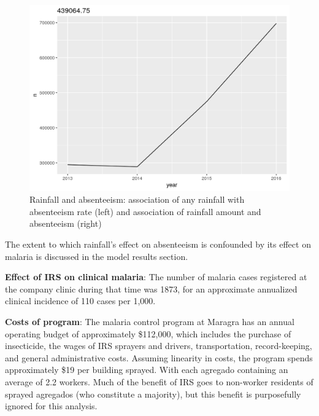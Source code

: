 \documentclass[]{article}
\begin{document}
\begin{figure}[!h]

{\centering \includegraphics{figures/unnamed-chunk-27-1} 

}

\caption{Rainfall and absenteeism: association of any rainfall with absenteeism rate (left) and association of rainfall amount and absenteeism (right)}\label{fig:unnamed-chunk-27}
\end{figure}

The extent to which rainfall's effect on absenteeism is confounded by
its effect on malaria is discussed in the model results section.

\textbf{Effect of IRS on clinical malaria}: The number of malaria cases
registered at the company clinic during that time was 1873, for an
approximate annualized clinical incidence of 110 cases per 1,000.

\textbf{Costs of program}: The malaria control program at Maragra has an
annual operating budget of approximately \$112,000, which includes the
purchase of insecticide, the wages of IRS sprayers and drivers,
transportation, record-keeping, and general administrative costs.
Assuming linearity in costs, the program spends approximately \$19 per
building sprayed. With each agregado containing an average of 2.2
workers. Much of the benefit of IRS goes to non-worker residents of
sprayed agregados (who constitute a majority), but this benefit is
purposefully ignored for this analysis.
\end{document}
